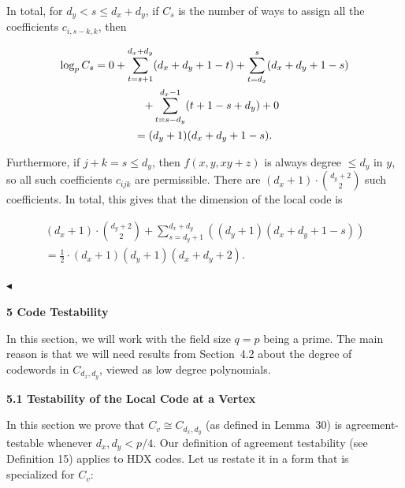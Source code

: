 In total, for $d_{y}<s\leq d_{x}+d_{y}$, if $C_{s}$ is the number of ways to assign all the coefficients $c_{i,s-k,k}$, then\par


\[\begin{gathered}
\displaystyle\log_{p}C_{s} \displaystyle=0+\sum_{t=s+1}^{d_{x}+d_{y}}(d_{x}+d_{y}+1-t)+\sum_{t=d_{x}}^{s}(d_{x}+d_{y}+1-s) \\
\displaystyle\nobreak\ \nobreak\ \nobreak\ \nobreak\ +\sum_{t=s-d_{y}}^{d_{x}-1}(t+1-s+d_{y})+0 \\
\displaystyle=(d_{y}+1)(d_{x}+d_{y}+1-s).
\end{gathered}\]


Furthermore, if $j+k=s\leq d_{y}$, then $f(x,y,xy+z)$ is always degree $\leq d_{y}$ in $y$, so all such coefficients $c_{ijk}$ are permissible. There are $(d_{x}+1)\cdot\binom{d_{y}+2}{2}$ such coefficients. In total, this gives that the dimension of the local code is\par


\[\begin{gathered}
\displaystyle(d_{x}+1)\cdot\binom{d_{y}+2}{2}+\sum_{s=d_{y}+1}^{d_{x}+d_{y}}\left((d_{y}+1)(d_{x}+d_{y}+1-s)\right) \\
\displaystyle=\frac{1}{2}\cdot(d_{x}+1)(d_{y}+1)(d_{x}+d_{y}+2).
\end{gathered}\]


$\blacktriangleleft$\par







\par\medskip\noindent\textbf{
5 Code Testability}\par




In this section, we will work with the field size $q=p$ being a prime. The main reason is that we will need results from Section 4.2 about the degree of codewords in $C_{d_{x},d_{y}}$, viewed as low degree polynomials.\par




\par\medskip\noindent\textbf{
5.1 Testability of the Local Code at a Vertex}\par




In this section we prove that $C_{v}\cong C_{d_{x},d_{y}}$ (as defined in Lemma 30) is agreement-testable whenever $d_{x},d_{y}<p/4$. Our definition of agreement testability (see Definition 15) applies to HDX codes. Let us restate it in a form that is specialized for $C_{v}$:\par



